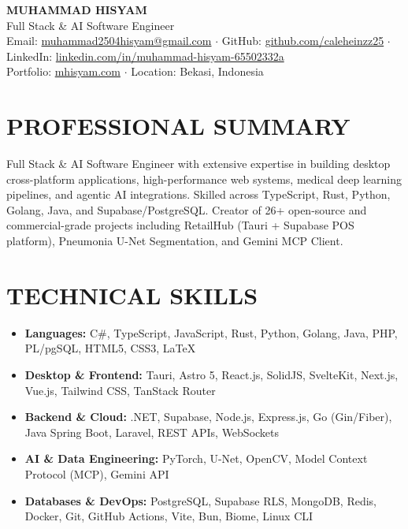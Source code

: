 \documentclass[10pt,a4paper]{article}
\begin{document}
\begin{center}
    {\Huge \bfseries \color{navyColor} MUHAMMAD HISYAM}\\[3pt]
    {\selectfont \color{emeraldColor}\large Full Stack \& AI Software Engineer}\\[6pt]
    \small
    Email: \href{mailto:muhammad2504hisyam@gmail.com}{muhammad2504hisyam@gmail.com} \quad $\cdot$ \quad
    GitHub: \href{https://github.com/caleheinzz25}{github.com/caleheinzz25} \quad $\cdot$ \quad
    LinkedIn: \href{https://www.linkedin.com/in/muhammad-hisyam-65502332a/}{linkedin.com/in/muhammad-hisyam-65502332a}\\[2.5pt]
    Portfolio: \href{https://mhisyam.com}{mhisyam.com} \quad $\cdot$ \quad
    Location: Bekasi, Indonesia
\end{center}

\vspace{-6pt}

\section{PROFESSIONAL SUMMARY}
Full Stack \& AI Software Engineer with extensive expertise in building desktop cross-platform applications, high-performance web systems, medical deep learning pipelines, and agentic AI integrations. Skilled across TypeScript, Rust, Python, Golang, Java, and Supabase/PostgreSQL. Creator of 26+ open-source and commercial-grade projects including RetailHub (Tauri + Supabase POS platform), Pneumonia U-Net Segmentation, and Gemini MCP Client.

\section{TECHNICAL SKILLS}
\begin{itemize}[label={}]
    \item \textbf{Languages:} C\#, TypeScript, JavaScript, Rust, Python, Golang, Java, PHP, PL/pgSQL, HTML5, CSS3, LaTeX
    \item \textbf{Desktop \& Frontend:} Tauri, Astro 5, React.js, SolidJS, SvelteKit, Next.js, Vue.js, Tailwind CSS, TanStack Router
    \item \textbf{Backend \& Cloud:} .NET, Supabase, Node.js, Express.js, Go (Gin/Fiber), Java Spring Boot, Laravel, REST APIs, WebSockets
    \item \textbf{AI \& Data Engineering:} PyTorch, U-Net, OpenCV, Model Context Protocol (MCP), Gemini API
    \item \textbf{Databases \& DevOps:} PostgreSQL, Supabase RLS, MongoDB, Redis, Docker, Git, GitHub Actions, Vite, Bun, Biome, Linux CLI
\end{itemize}
\end{document}
